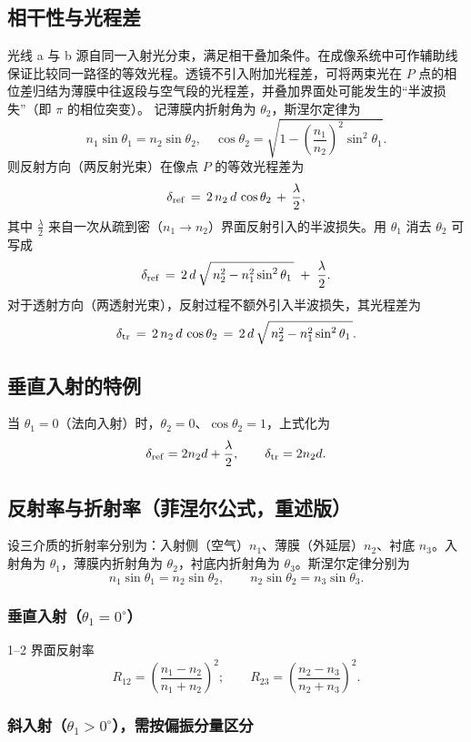 \documentclass[withoutpreface,bwprint]{cumcmthesis} %
\begin{document}
\subsection{相干性与光程差}
光线 a 与 b 源自同一入射光分束，满足相干叠加条件。在成像系统中可作辅助线保证比较同一路径的等效光程。透镜不引入附加光程差，可将两束光在 \(P\) 点的相位差归结为薄膜中往返段与空气段的光程差，并叠加界面处可能发生的“半波损失”（即 \(\pi\) 的相位突变）。
记薄膜内折射角为 \(\theta_2\)，斯涅尔定律为
\[
    n_1\sin\theta_1=n_2\sin\theta_2,\quad \cos\theta_2=\sqrt{1-\left(\frac{n_1}{n_2}\right)^2\sin^2\theta_1}.
\]
则反射方向（两反射光束）在像点 \(P\) 的等效光程差为
\[
    \delta_{\rm ref} \,=\, 2\,n_2\,d\,\cos\theta_2 \, + \, \frac{\lambda}{2},
\]
其中 \(\tfrac{\lambda}{2}\) 来自一次从疏到密（\(n_1\to n_2\)）界面反射引入的半波损失。用 \(\theta_1\) 消去 \(\theta_2\) 可写成
\[
    \delta_{\rm ref} \,=\, 2\,d\,\sqrt{\,n_2^2 - n_1^2\sin^2\theta_1\,}\; +\; \frac{\lambda}{2}.
\]
对于透射方向（两透射光束），反射过程不额外引入半波损失，其光程差为
\[
    \delta_{\rm tr} \,=\, 2\,n_2\,d\,\cos\theta_2 \,=\, 2\,d\,\sqrt{\,n_2^2 - n_1^2\sin^2\theta_1\,}.
\]

\subsection{垂直入射的特例}
当 \(\theta_1=0\)（法向入射）时，\(\theta_2=0\)、\(\cos\theta_2=1\)，上式化为
\[
    \delta_{\rm ref}=2n_2d+\frac{\lambda}{2},\qquad \delta_{\rm tr}=2n_2d.
\]

\subsection{反射率与折射率（菲涅尔公式，重述版）}
设三介质的折射率分别为：入射侧（空气）\(n_1\)、薄膜（外延层）\(n_2\)、衬底 \(n_3\)。入射角为 \(\theta_1\)，薄膜内折射角为 \(\theta_2\)，衬底内折射角为 \(\theta_3\)。斯涅尔定律分别为
\[
    n_1\sin\theta_1=n_2\sin\theta_2,\qquad n_2\sin\theta_2=n_3\sin\theta_3.
\]
\subsubsection{垂直入射（\(\theta_1=0^\circ\)）}
1--2 界面反射率
\[
    R_{12}=\left(\frac{n_1-n_2}{n_1+n_2}\right)^2;\qquad
    R_{23}=\left(\frac{n_2-n_3}{n_2+n_3}\right)^2.
\]
\subsubsection{斜入射（\(\theta_1>0^\circ\)），需按偏振分量区分}
\end{document}
